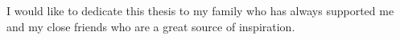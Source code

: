 I would like to dedicate this thesis to my family who has always supported me and my close friends who are a great source of inspiration.